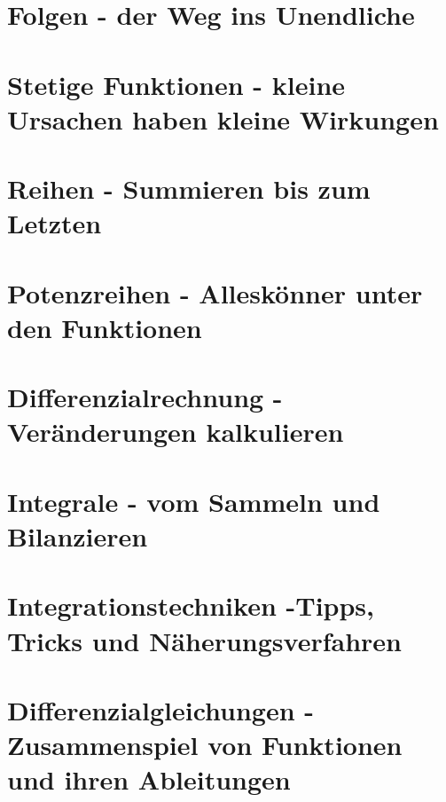 \documentclass[a4paper]{article}
\begin{document}
\section{Folgen - der Weg ins Unendliche}

\section{Stetige Funktionen - kleine Ursachen haben kleine Wirkungen}

\section{Reihen - Summieren bis zum Letzten}

\section{Potenzreihen - Alleskönner unter den Funktionen}

\section{Differenzialrechnung - Veränderungen kalkulieren}

\section{Integrale - vom Sammeln und Bilanzieren}

\section{Integrationstechniken -Tipps, Tricks und Näherungsverfahren}

\section{Differenzialgleichungen - Zusammenspiel von Funktionen und ihren Ableitungen}
\end{document}
